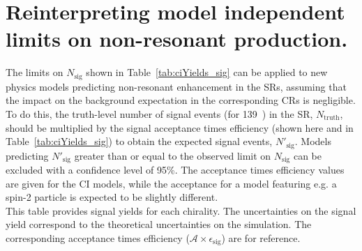 \chapter{Reinterpreting model independent limits on non-resonant production.}

The limits on $N_\text{sig}$ shown in Table~\ref{tab:ciYields_sig} can be applied to new physics models predicting non-resonant enhancement in the SRs, assuming that the impact on the background expectation in the corresponding CRs is negligible.
To do this, the truth-level number of signal events (for 139~\fb) in the SR, $N_\text{truth}$, should be multiplied by the signal acceptance times efficiency (shown here and in Table~\ref{tab:ciYields_sig}) to obtain the expected signal events, $N'_\text{sig}$.
Models predicting $N'_\text{sig}$ greater than or equal to the observed limit on $N_\text{sig}$ can be excluded with a confidence level of 95\%.
The acceptance times efficiency values are given for the CI models, while the acceptance for a model featuring e.g. a spin-2 particle is expected to be slightly different.
\\
    This table provides signal yields for each chirality. The uncertainties on the signal yield correspond to the theoretical uncertainties on the simulation. The corresponding acceptance times efficiency ($\mathcal{A}\times\epsilon_\textrm{sig}$) are for reference.

